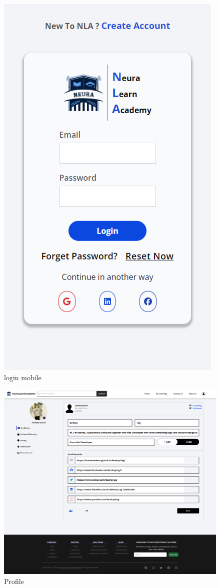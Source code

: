 \begin{figure}[h!]
	\centering
	\includegraphics[max height=\textheight,max width=\textwidth]{figures/frontend/login mobile.png}
	\caption{login mobile}
\end{figure}

\begin{figure}[h!]
	\centering
	\includegraphics[max height=\textheight,max width=\textwidth]{figures/frontend/profile.png}
	\caption{Profile }
\end{figure}